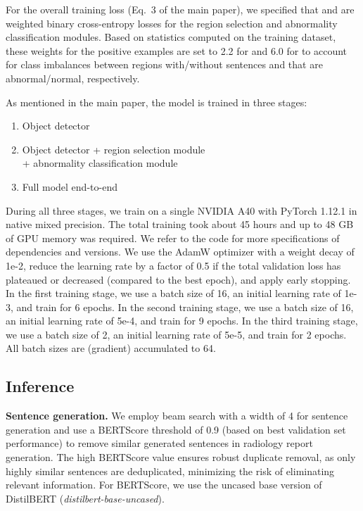 \documentclass[10pt,twocolumn,letterpaper]{article}
\begin{document}
For the overall training loss (Eq.\ 3 of the main paper), we specified that  and  are weighted binary cross-entropy losses for the region selection and abnormality classification modules. Based on statistics computed on the training dataset, these weights for the positive examples are set to 2.2 for  and 6.0 for  to account for class imbalances between regions with/without sentences and that are abnormal/normal, respectively.

As mentioned in the main paper, the model is trained in three stages:

\begin{enumerate}
    \item Object detector
    \item Object detector + region selection module \\ + abnormality classification module
    \item Full model end-to-end
\end{enumerate}

During all three stages, we train on a single NVIDIA A40 with PyTorch 1.12.1 in native mixed precision. The total training took about 45 hours and up to 48 GB of GPU memory was required. We refer to the code for more specifications of dependencies and versions. We use the AdamW \cite{loshchilov2018decoupled} optimizer with a weight decay of 1e-2,
reduce the learning rate by a factor of 0.5 if the total validation loss has plateaued or decreased (compared to the best epoch), and apply early stopping.
In the first training stage, we use a batch size of 16, an initial learning rate of 1e-3, and train for 6 epochs.
In the second training stage, we use a batch size of 16, an initial learning rate of 5e-4, and train for 9 epochs.
In the third training stage, we use a batch size of 2, an initial learning rate of 5e-5, and train for 2 epochs.
All batch sizes are (gradient) accumulated to 64.

\subsection{Inference}

\noindent\textbf{Sentence generation.} We employ beam search with a width of 4 for sentence generation and use a BERTScore \cite{zhang2019bertscore} threshold of 0.9 (based on best validation set performance) to remove similar generated sentences in radiology report generation. The high BERTScore value ensures robust duplicate removal, as only highly similar sentences are deduplicated, minimizing the risk of eliminating relevant information. For BERTScore, we use the uncased base version of DistilBERT \cite{sanh2019distilbert} (\emph{distilbert-base-uncased}).
\end{document}
